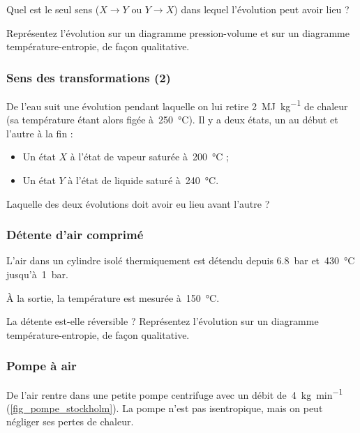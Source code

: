 	Quel est le seul sens ($X \to Y$ ou $Y \to X$) dans lequel l’évolution peut avoir lieu ?
	
	Représentez l’évolution sur un diagramme pression-volume et sur un diagramme température-entropie, de façon qualitative.

\subsubsection{Sens des transformations (2)}
\label{exo_sens_transfos_deux}

	De l’eau suit une évolution pendant laquelle on lui retire \SI{2}{\mega\joule\per\kilogram} de chaleur (sa température étant alors figée à~\SI{250}{\degreeCelsius}). Il y a deux états, un au début et l’autre à la fin :
		\begin{itemize}
			\item Un état $X$ à l’état de vapeur saturée à~\SI{200}{\degreeCelsius} ;
			\item Un état $Y$ à l’état de liquide saturé à~\SI{240}{\degreeCelsius}.
		\end{itemize}
	Laquelle des deux évolutions doit avoir eu lieu avant l’autre ?

\subsubsection{Détente d’air comprimé}
\label{exo_detente_air_irreversible}

	L’air dans un cylindre isolé thermiquement est détendu depuis \SI{6,8}{\bar} et~\SI{430}{\degreeCelsius} jusqu’à~\SI{1}{\bar}.

	À la sortie, la température est mesurée à~\SI{150}{\degreeCelsius}.

	La détente est-elle réversible ? Représentez l’évolution sur un diagramme température-entropie, de façon qualitative.


\subsubsection{Pompe à air}
\label{exo_pompe_air}

	De l’air rentre dans une petite pompe centrifuge avec un débit de~\SI{4}{\kilogram\per\minute} (\cref{fig_pompe_stockholm}). La pompe n’est pas isentropique, mais on peut négliger ses pertes de chaleur.
	
